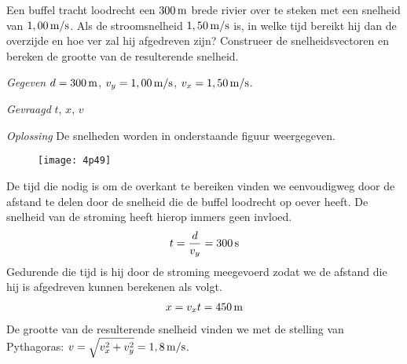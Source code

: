 
\begin{exercise}




 Een buffel tracht loodrecht een $300\rm\,m$ brede rivier over te steken met een snelheid van $1,00\rm\,m/s$. Als de stroomsnelheid $1,50\rm\,m/s$ is, in welke tijd bereikt hij dan de overzijde en hoe ver zal hij afgedreven zijn? Construeer de snelheidsvectoren en bereken de grootte van de resulterende snelheid.
\begin{oplossing}
\item[\textit{Gegeven}]$d=300\rm\,m$, $v_y=1,00\rm\,m/s$, $v_x=1,50\rm\,m/s$.
\item[\textit{Gevraagd}]$t$, $x$, $v$
\item[\textit{Oplossing}]De snelheden worden in onderstaande figuur weergegeven.
\begin{figure}[h]
\begin{center}
\texttt{[image: 4p49]}
\end{center}
\end{figure}
De tijd die nodig is om de overkant te bereiken vinden we eenvoudigweg door de afstand te delen door de snelheid die de buffel loodrecht op oever heeft. De snelheid van de stroming heeft hierop immers geen invloed.
\begin{eqnarray*}
t=\frac{d}{v_y}=300\rm\,s
\end{eqnarray*}
Gedurende die tijd is hij door de stroming meegevoerd zodat we de afstand die hij is afgedreven kunnen berekenen als volgt.
\begin{eqnarray*}
x=v_xt=450\rm\,m
\end{eqnarray*}
De grootte van de resulterende snelheid vinden we met de stelling van Pythagoras: $v=\sqrt{v_x^2+v_y^2}=1,8\rm\,m/s$.
\end{oplossing}

\end{exercise}
